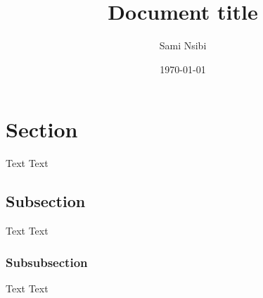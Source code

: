 \documentclass[11pt, a4paper, oneside]{article}
\title{Document title}
\author{Sami Nsibi}
\date{\today}
\begin{document}
\maketitle

\tableofcontents

\section{Section}
Text Text

\subsection{Subsection}
Text Text

\subsubsection{Subsubsection}
Text Text
\end{document}
